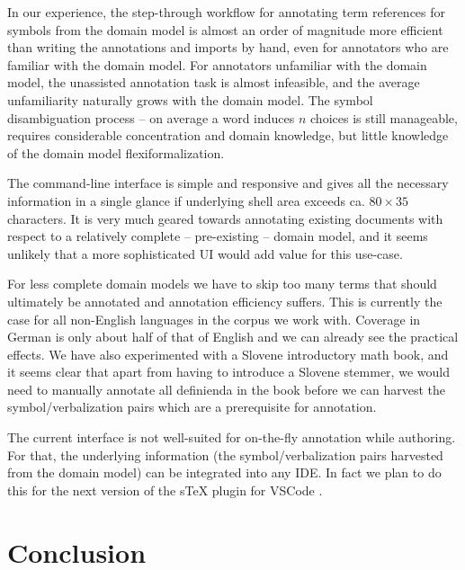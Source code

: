 \documentclass{llncs}
\begin{document}
In our experience, the step-through workflow for annotating term references for symbols
from the domain model is almost an order of magnitude more efficient than writing the
annotations and imports by hand, even for annotators who are familiar with the domain
model. For annotators unfamiliar with the domain model, the unassisted annotation task is
almost infeasible, and the average unfamiliarity naturally grows with the domain
model. The symbol disambiguation process -- on average a word induces $n$ choices is still manageable,
requires considerable concentration and domain knowledge, but little knowledge of the
domain model flexiformalization.

The command-line interface is simple and responsive and gives all the necessary
information in a single glance if underlying shell area exceeds ca. $80\times 35$
characters. It is very much geared towards annotating existing documents with respect to a
relatively complete -- pre-existing -- domain model, and it seems unlikely that a more
sophisticated UI would add value for this use-case.

For less complete domain models we have to skip too many terms that should ultimately be
annotated and annotation efficiency suffers. This is currently the case for all
non-English languages in the \sTeX corpus we work with. Coverage in German is only about
half of that of English and we can already see the practical effects. We have also
experimented with a Slovene introductory math book, and it seems clear that apart from
having to introduce a Slovene stemmer, we would need to manually annotate all
definienda in the book before we can harvest the symbol/verbalization pairs which are a
prerequisite for annotation.

The current interface is not well-suited for on-the-fly annotation while authoring.
For that, the underlying information (the symbol/verbalization pairs harvested
from the domain model) can be integrated into any IDE. In fact we plan to do this for the
next version of the sTeX plugin for VSCode \cite{sTeX-IDE:git}.

\section{Conclusion}
\end{document}
